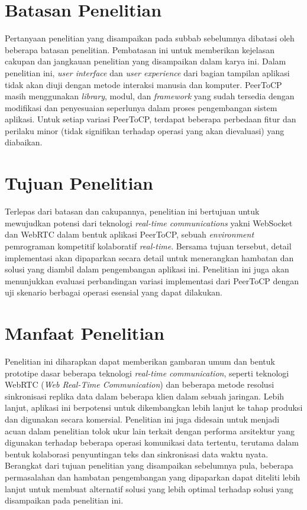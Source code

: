 \section{Batasan Penelitian}
\label{sec:batasanMasalah}
Pertanyaan penelitian yang disampaikan pada subbab sebelumnya dibatasi oleh beberapa batasan penelitian. Pembatasan ini untuk memberikan kejelasan cakupan dan jangkauan penelitian yang disampaikan dalam karya ini. Dalam penelitian ini, \textit{user interface} dan \textit{user experience} dari bagian tampilan aplikasi tidak akan diuji dengan metode interaksi manusia dan komputer. PeerToCP masih menggunakan \textit{library}, modul, dan \textit{framework} yang sudah tersedia dengan modifikasi dan penyesuaian seperlunya dalam proses pengembangan sistem aplikasi. Untuk setiap variasi PeerToCP, terdapat beberapa perbedaan fitur dan perilaku minor (tidak signifikan terhadap operasi yang akan dievaluasi) yang diabaikan.



\section{Tujuan Penelitian}
\label{sec:tujuan}
Terlepas dari batasan dan cakupannya, penelitian ini bertujuan untuk mewujudkan potensi dari teknologi \textit{real-time communications} yakni WebSocket dan WebRTC dalam bentuk aplikasi PeerToCP, sebuah \textit{environment} pemrograman kompetitif kolaboratif \textit{real-time}. Bersama tujuan tersebut, detail implementasi akan dipaparkan secara detail untuk menerangkan hambatan dan solusi yang diambil dalam pengembangan aplikasi ini. Penelitian ini juga akan menunjukkan evaluasi perbandingan variasi implementasi dari PeerToCP dengan uji skenario berbagai operasi esensial yang dapat dilakukan.


\section{Manfaat Penelitian}
\label{sec:manfaat}
Penelitian ini diharapkan dapat memberikan gambaran umum dan bentuk prototipe dasar beberapa teknologi \textit{real-time communication}, seperti teknologi WebRTC (\textit{Web Real-Time Communication}) dan beberapa metode resolusi sinkronisasi replika data dalam beberapa klien dalam sebuah jaringan. Lebih lanjut, aplikasi ini berpotensi untuk dikembangkan lebih lanjut ke tahap produksi dan digunakan secara komersial. Penelitian ini juga didesain untuk menjadi acuan dalam penelitian tolok ukur lain terkait dengan performa arsitektur yang digunakan terhadap beberapa operasi komunikasi data tertentu, terutama dalam bentuk kolaborasi penyuntingan teks dan sinkronisasi data waktu nyata. Berangkat dari tujuan penelitian yang disampaikan sebelumnya pula, beberapa permasalahan dan hambatan pengembangan yang dipaparkan dapat diteliti lebih lanjut untuk membuat alternatif solusi yang lebih optimal terhadap solusi yang disampaikan pada penelitian ini.


